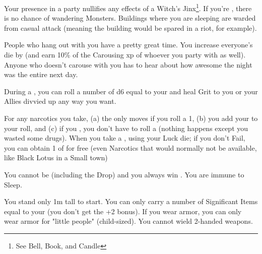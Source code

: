 {    

  
    Your presence in a party nullifies any effects of a Witch's Jinx\footnote{See Bell, Book, and Candle}.  If you're , there is no chance of wandering Monsters. Buildings where you are sleeping are warded from casual attack (meaning the building would be spared in a riot, for example). 

  
    People who hang out with you have a pretty great time.  You increase everyone's  die by \DCUP (and earn 10\% of the Carousing xp of whoever you party with as well). Anyone who doesn't carouse with you has to hear about how awesome the night was the entire next day.    

  
    During a , you can roll a number of d6 equal to your \LVL and heal \SUM Grit to you or your Allies divvied up any way you want.  


    For any narcotics you take, (a) the \UD only moves \DCDOWN if you roll a 1, (b) you add your \LVL to your  roll, and (c) if you , you don't have to roll a  (nothing happens except you wasted some drugs).  When you take a , \RS using your Luck die; if you don't Fail, you can obtain 1 \UD of   for free (even Narcotics that would normally not be available, like Black Lotus in a Small town)

  
    You cannot be  (including the Drop) and you always win .  You are immune to Sleep.




  You stand only 1m tall to start.  You can only carry a number of Significant Items equal to your \MAX \VIG (you don't get the +2 bonus). If you wear armor, you can only wear armor for "little people" (child-sized).  You cannot wield 2-handed weapons.

}
